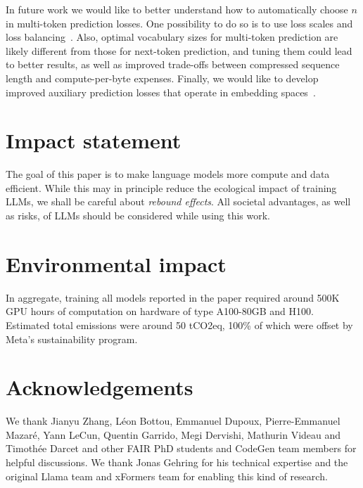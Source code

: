 \documentclass{article}
\theoremstyle{plain}
\theoremstyle{definition}
\theoremstyle{remark}
\begin{document}
In future work we would like to better understand how to automatically choose $n$ in multi-token prediction losses.
One possibility to do so is to use loss scales and loss balancing~\cite{defossez2022highfi}.
Also, optimal vocabulary sizes for multi-token prediction are likely different from those for next-token prediction, and tuning them could lead to better results, as well as improved trade-offs between compressed sequence length and compute-per-byte expenses.
Finally, we would like to develop improved auxiliary prediction losses that operate in embedding spaces~\cite{lecun2022path}.

\section*{Impact statement}
The goal of this paper is to make language models more compute and data efficient. While this may in principle reduce the ecological impact of training LLMs, we shall be careful about \emph{rebound effects}.
All societal advantages, as well as risks, of LLMs should be considered while using this work.

\section*{Environmental impact}
In aggregate, training all models reported in the paper required around 500K GPU hours of computation on hardware of type A100-80GB and H100. Estimated total emissions were around 50 tCO2eq, 100\% of which were offset by Meta’s sustainability program.

\section*{Acknowledgements}
We thank Jianyu Zhang, Léon Bottou, Emmanuel Dupoux, Pierre-Emmanuel Mazaré, Yann LeCun, Quentin Garrido, Megi Dervishi, Mathurin Videau and Timothée Darcet and other FAIR PhD students and CodeGen team members for helpful discussions. We thank Jonas Gehring for his technical expertise and the original Llama team and xFormers team for enabling this kind of research.

\clearpage




\clearpage
\newpage

\renewcommand{\thefigure}{S\arabic{figure}}
\renewcommand{\thetable}{S\arabic{table}}
\newpage
\appendix
\onecolumn
\end{document}
